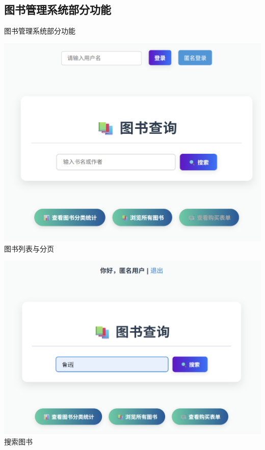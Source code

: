 \documentclass{ctexbeamer}
\begin{document}
\subsection{图书管理系统部分功能}
\begin{frame}{图书管理系统部分功能}
  \centering
  \begin{minipage}{0.45\textwidth}
    \includegraphics[width=\textwidth]{fig/book1.png}\\ 图书列表与分页
  \end{minipage}
  \begin{minipage}{0.45\textwidth}
    \includegraphics[width=\textwidth]{fig/book2.png}\\ 搜索图书
  \end{minipage}
  \vspace{0.3cm}

\end{frame}
\end{document}
